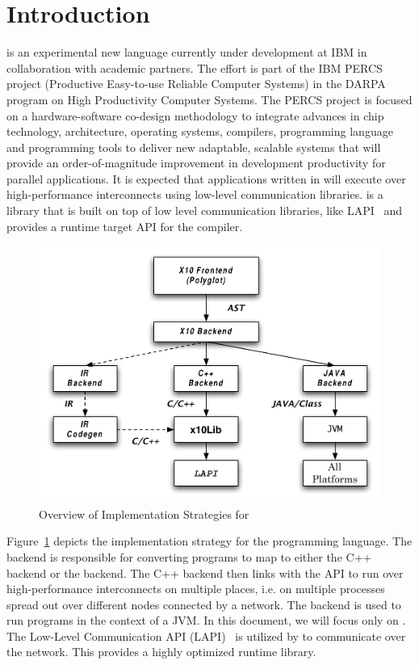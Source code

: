 \section{Introduction}

\Xten{} is an experimental new language currently under development at
IBM in collaboration with academic partners. The \Xten{} effort is part of
the IBM PERCS project (Productive Easy-to-use Reliable Computer Systems)
in the DARPA program on High Productivity Computer Systems. The PERCS
project is focused on a hardware-software co-design methodology to
integrate advances in chip technology, architecture, operating systems,
compilers, programming language and programming tools to deliver new
adaptable, scalable systems that will provide an order-of-magnitude
improvement in development productivity for parallel applications. It is
expected that applications written in \Xten{} will execute over
high-performance interconnects using low-level communication libraries.
\Xtenlib{} is a library that is built on top of low level communication
libraries, like LAPI~\cite{LAPI} and provides a runtime target API for
the \Xten{} compiler.

\begin{figure}
\center
\includegraphics[scale=0.5]{figs/x10-block.pdf}
\caption{Overview of Implementation Strategies for \Xten{}}
\label{fig:x10-block}
\end{figure}

Figure~\ref{fig:x10-block} depicts the implementation strategy for the
\Xten{} programming language. The \Xten{} backend is responsible for
converting \Xten{} programs to map to either the C++ backend or the
{} backend. The C++ backend then links with the \Xtenlib{} API
to run over high-performance interconnects on multiple places, i.e. on
multiple processes spread out over different nodes connected by a
network. The {} backend is used to run \Xten{} programs in the
context of a JVM. In this document, we will focus only on \Xtenlib{}.
The Low-Level Communication API (LAPI)~\cite{LAPI} is utilized by
\Xtenlib{} to communicate over the network. This provides a highly
optimized runtime library.

